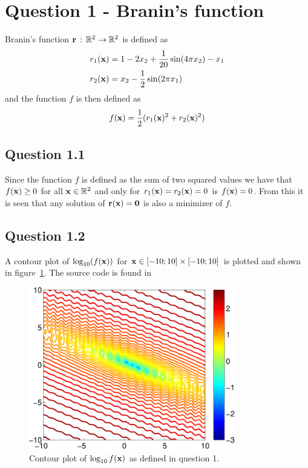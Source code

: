 \def\assignmenttitle{Assignment 1}
\def\assignmentdate{16-10-2011}
\def\assignmentnumber{1}





\maketitle

\section*{Question 1 - Branin's function}
Branin's function $\mathbf{r}\,:\,\mathbb{R}^2\to\mathbb{R}^2$ is defined as
\begin{align}
    r_1(\mathbf{x}) &= 1 - 2x_2 + \frac{1}{20}\sin(4\pi x_2) - x_1 \nonumber\\
    r_2(\mathbf{x}) &= x_2 - \frac{1}{2}\sin(2\pi x_1)\label{eq:branin}
\end{align}
and the function $f$ is then defined as
\begin{equation}\label{eq:braninsq}
    f(\mathbf{x}) = \frac{1}{2}(r_1(\mathbf{x})^2 + r_2(\mathbf{x})^2)
\end{equation}
\subsection*{Question 1.1}
Since the function $f$ is defined as the sum of two squared values we have that $f(\mathbf{x})\geq 0$ for all $\mathbf{x}\in\mathbb{R}^2$ and only for $r_1(\mathbf{x})=r_2(\mathbf{x})=0$ is $f(\mathbf{x})=0$. From this it is seen that any solution of $\mathbf{r}(\mathbf{x})=\mathbf{0}$ is also a minimizer of $f$.


\subsection*{Question 1.2}
A contour plot of $\log_{10}(f(\mathbf{x}))$ for $\mathbf{x}\in[-10;10]\times[-10;10]$ is plotted and shown in figure~\ref{fig:q12}. The source code is found in 
\begin{figure}
    \centering
    \includegraphics[width=90mm]{q12-crop.pdf}
    \caption{Contour plot of $\log_{10}f(\mathbf{x})$ as defined in question 1.}
    \label{fig:q12}
\end{figure}


